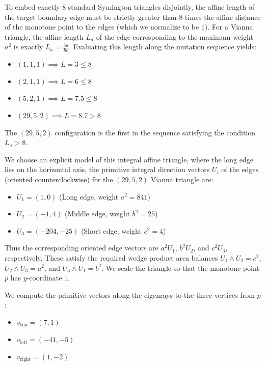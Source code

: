 \documentclass[11pt, reqno]{amsart}
\theoremstyle{definition}
\begin{document}
To embed exactly 8 standard Symington triangles disjointly, the affine length of the target boundary edge must be strictly greater than 8 times the affine distance of the monotone point to the edges (which we normalize to be $1$). For a Vianna triangle, the affine length $L_a$ of the edge corresponding to the maximum weight $a^2$ is exactly $L_a = \frac{3a}{bc}$. Evaluating this length along the mutation sequence yields:
\begin{itemize}
    \item $(1, 1, 1) \implies L = 3 \le 8$
    \item $(2, 1, 1) \implies L = 6 \le 8$
    \item $(5, 2, 1) \implies L = 7.5 \le 8$
    \item $(29, 5, 2) \implies L = 8.7 > 8$
\end{itemize}
The $(29, 5, 2)$ configuration is the first in the sequence satisfying the condition $L_a > 8$.



We choose an explicit model of this integral affine triangle, where the long edge lies on the horizontal axis, the primitive integral direction vectors $U_i$ of the edges (oriented counterclockwise) for the $(29, 5, 2)$ Vianna triangle are:
\begin{itemize}
    \item $U_1 = (1, 0)$ (Long edge, weight $a^2 = 841$)
    \item $U_2 = (-1, 4)$ (Middle edge, weight $b^2 = 25$)
    \item $U_3 = (-204, -25)$ (Short edge, weight $c^2 = 4$)
\end{itemize}Thus the corresponding oriented edge vectors are
$a^2U_1$, $b^2U_2$, and $c^2U_3$, respectively.
These satisfy the required wedge product area balances $U_1 \wedge U_2 = c^2$, $U_2 \wedge U_3 = a^2$, and $U_3 \wedge U_1 = b^2$. We scale the triangle so that the monotone point $p$ has $y$-coordinate $1$.

We compute the primitive vectors along the eigenrays to the three vertices from $p$:
\begin{itemize}
    \item $v_{\text{top}} = (7, 1)$
    \item $v_{\text{left}} = (-41, -5)$
    \item $v_{\text{right}} = (1, -2)$
\end{itemize}
\end{document}
